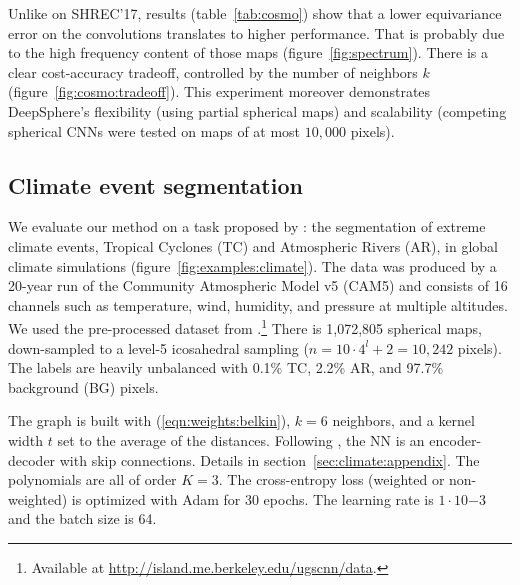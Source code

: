 \documentclass{article} %
\newcommand{\todo}[1]{{\color[rgb]{.6,.1,.6}{#1}}}
\newcommand{\figref}[1]{figure~\ref{fig:#1}}
\newcommand{\tabref}[1]{table~\ref{tab:#1}}
\newcommand{\secref}[1]{section~\ref{sec:#1}}
\newcommand{\eqnref}[1]{(\ref{eqn:#1})}
\begin{document}
Unlike on SHREC'17, results (\tabref{cosmo}) show that a lower equivariance error on the convolutions translates to higher performance.
That is probably due to the high frequency content of those maps (\figref{spectrum}).
There is a clear cost-accuracy tradeoff, controlled by the number of neighbors $k$ (\figref{cosmo:tradeoff}).
This experiment moreover demonstrates DeepSphere's flexibility (using partial spherical maps) and scalability (competing spherical CNNs were tested on maps of at most $10,000$ pixels).

\subsection{Climate event segmentation} \label{sec:exp:climate}

We evaluate our method on a task proposed by \citep{mudigonda2017climateevents}: the segmentation of extreme climate events, Tropical Cyclones (TC) and Atmospheric Rivers (AR), in global climate simulations (\figref{examples:climate}).
The data was produced by a 20-year run of the Community Atmospheric Model v5 (CAM5) and consists of 16 channels such as temperature, wind, humidity, and pressure at multiple altitudes.
We used the pre-processed dataset from \citep{jiang2019sphericalcnn}.\footnote{Available at \url{http://island.me.berkeley.edu/ugscnn/data}.}
There is 1,072,805 spherical maps, down-sampled to a level-5 icosahedral sampling ($n = 10 \cdot 4^l + 2 = 10,242$ pixels).
The labels are heavily unbalanced with 0.1\% TC, 2.2\% AR, and 97.7\% background (BG) pixels.

The graph is built with \eqnref{weights:belkin}, $k = 6$ neighbors, and a kernel width $t$ set to the average of the distances.
Following \citet{jiang2019sphericalcnn}, the NN is an encoder-decoder with skip connections.
Details in \secref{climate:appendix}.
The polynomials are all of order $K=3$.
The cross-entropy loss (weighted or non-weighted) is optimized with Adam for 30 epochs.
The learning rate is $1 \cdot 10{-3}$ and the batch size is 64.
\end{document}
